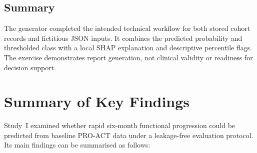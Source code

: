 \subsection{Summary}
The generator completed the intended technical workflow for both stored cohort records and fictitious \gls{JSON} inputs.
It combines the predicted probability and thresholded class with a local SHAP explanation and descriptive percentile flags.
The exercise demonstrates report generation, not clinical validity or readiness for decision support.

\clearpage
\section{Summary of Key Findings}
\label{sec:results_summary}

Study~I examined whether rapid six-month functional progression could be predicted from baseline \gls{PRO-ACT} data under a leakage-free evaluation protocol.
Its main findings can be summarised as follows:

